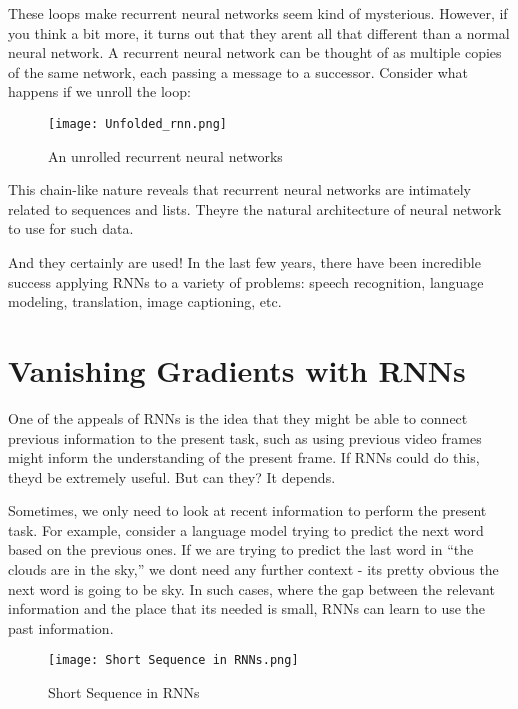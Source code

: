 These loops make recurrent neural networks seem kind of mysterious. However, if you think a bit more, it turns out that they aren\textquotesingle t all that different than a normal neural network. A recurrent neural network can be thought of as multiple copies of the same network, each passing a message to a successor. Consider what happens if we unroll the loop:

\begin{figure}[H]
    \centering
    \texttt{[image: Unfolded\_rnn.png]}
    \caption{An unrolled recurrent neural networks}
    \label{fig:Unrolled RNNs}
\end{figure}

This chain-like nature reveals that recurrent neural networks are intimately related to sequences and lists. They\textquotesingle re the natural architecture of neural network to use for such data.

And they certainly are used! In the last few years, there have been incredible success applying RNNs to a variety of problems: speech recognition, language modeling, translation, image captioning, etc.

\section{Vanishing Gradients with RNNs}
One of the appeals of RNNs is the idea that they might be able to connect previous information to the present task, such as using previous video frames might inform the understanding of the present frame. If RNNs could do this, they\textquotesingle d be extremely useful. But can they? It depends.

Sometimes, we only need to look at recent information to perform the present task. For example, consider a language model trying to predict the next word based on the previous ones. If we are trying to predict the last word in “the clouds are in the sky,” we don\textquotesingle t need any further context - it\textquotesingle s pretty obvious the next word is going to be sky. In such cases, where the gap between the relevant information and the place that it\textquotesingle s needed is small, RNNs can learn to use the past information.

\begin{figure}[H]
    \centering
    \texttt{[image: Short Sequence in RNNs.png]}
    \caption{Short Sequence in RNNs}
    \label{fig:Short seq in  RNNs}
\end{figure}

